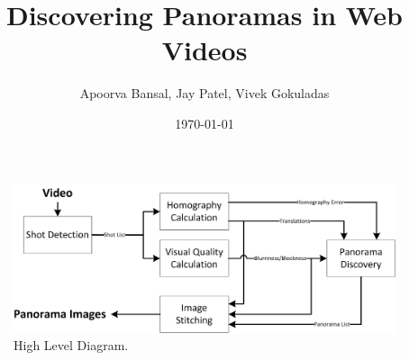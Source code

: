 \documentclass[10pt]{article}
\author{Apoorva Bansal, Jay Patel, Vivek Gokuladas}
\title{Discovering Panoramas in Web Videos}
\date{\today}
\begin{document}
\maketitle





\begin{multicols}{2}

\end{multicols}

\begin{figure}[t] 
  \centering
  \includegraphics[scale=1.2]{HLD.png}  
  \caption{High Level Diagram.} \label{fig:HLD}
\end{figure}

\begin{multicols}{2}





\end{multicols}
\end{document}
